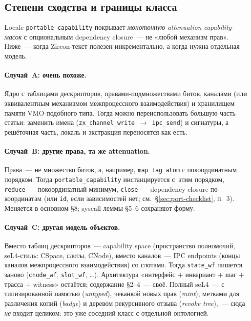 \documentclass[11pt,a4paper]{article}
\begin{document}
\subsection{Степени сходства и границы класса}
\label{sec:port-similarity}

Locale \texttt{portable\_capability} покрывает
\emph{монотонную attenuation capability-масок} с опциональным
dependency closure~--- не «любой механизм прав». Ниже~--- когда
Zircon-текст полезен инкрементально, а когда нужна отдельная модель.

\paragraph{Случай~A: очень похоже.}
Ядро с таблицами дескрипторов, правами-подмножествами битов, каналами
(или эквивалентным механизмом межпроцессного взаимодействия) и
хранилищем памяти VMO-подобного типа. Тогда можно
переиспользовать большую часть статьи: заменить имена
(\texttt{zx\_channel\_write}~$\to$~\texttt{ipc\_send}) и сигнатуры,
а решёточная часть, локаль и экстракция переносятся как есть.

\paragraph{Случай~B: другие права, та же attenuation.}
Права~--- не множество битов, а, например, \texttt{map tag atom} с
покоординатным порядком. Тогда \texttt{portable\_capability}
инстанцируется с~этим порядком, \texttt{reduce}~--- покоординатный
минимум, \texttt{close}~--- dependency closure по координатам (или
\texttt{id}, если зависимостей нет; см.~\S\ref{sec:port-checklist}, п.~3).
Меняется в основном §8;
syscall-леммы §5--6 сохраняют форму.

\paragraph{Случай~C: другая модель объектов.}
Вместо таблиц дескрипторов~--- \textenglish{capability} space
(пространство полномочий, seL4-стиль: CSpace, слоты, CNode), вместо
каналов~--- IPC endpoints (концы каналов межпроцессного взаимодействия)
со слотами. Тогда \texttt{state\_wf} пишется заново
(\texttt{cnode\_wf}, \texttt{slot\_wf}, \ldots). Архитектура
«интерфейс + инвариант + шаг + трасса + witness» остаётся; содержание
§2--4~--- своё. Полный seL4~--- с типизированной памятью (\emph{untyped}), чеканкой
новых прав (\emph{mint}), метками для различения копий
(\emph{badge}) и деревом рекурсивного отзыва (\emph{revoke tree}),~---
сюда \emph{не} входит целиком: это уже соседний класс с отдельной
онтологией.
\end{document}
